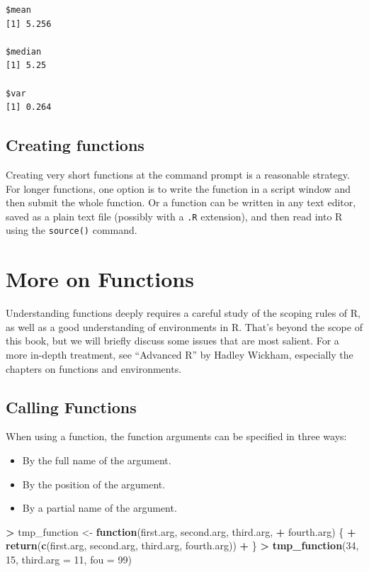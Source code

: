 \documentclass[]{krantz}
\makeatletter
\newenvironment{Shaded}{\begin{snugshade}}{\end{snugshade}}
\newcommand{\ControlFlowTok}[1]{\textcolor[rgb]{0.27,0.27,0.27}{\textbf{#1}}}
\newcommand{\DataTypeTok}[1]{\textcolor[rgb]{0.27,0.27,0.27}{#1}}
\newcommand{\DecValTok}[1]{\textcolor[rgb]{0.06,0.06,0.06}{#1}}
\newcommand{\KeywordTok}[1]{\textcolor[rgb]{0.27,0.27,0.27}{\textbf{#1}}}
\newcommand{\NormalTok}[1]{#1}
\newcommand{\OperatorTok}[1]{\textcolor[rgb]{0.43,0.43,0.43}{\textbf{#1}}}
\newcommand{\StringTok}[1]{\textcolor[rgb]{0.5,0.5,0.5}{#1}}
\providecommand{\tightlist}{%
  \setlength{\itemsep}{0pt}\setlength{\parskip}{0pt}}
\newenvironment{kframe}{%
\medskip{}
\setlength{\fboxsep}{.8em}
 \def\at@end@of@kframe{}%
 \ifinner\ifhmode%
  \def\at@end@of@kframe{\end{minipage}}%
  \begin{minipage}{\columnwidth}%
 \fi\fi%
 \def\FrameCommand##1{\hskip\@totalleftmargin \hskip-\fboxsep
 \colorbox{shadecolor}{##1}\hskip-\fboxsep
     \hskip-\linewidth \hskip-\@totalleftmargin \hskip\columnwidth}%
 \MakeFramed {\advance\hsize-\width
   \@totalleftmargin\z@ \linewidth\hsize
   \@setminipage}}%
 {\par\unskip\endMakeFramed%
 \at@end@of@kframe}
\renewenvironment{Shaded}{\begin{kframe}}{\end{kframe}}
\makeatother
\begin{document}
\begin{verbatim}
$mean
[1] 5.256

$median
[1] 5.25

$var
[1] 0.264
\end{verbatim}

\hypertarget{creating-functions}{%
\subsection{Creating functions}\label{creating-functions}}

Creating very short functions at the command prompt is a reasonable strategy. For longer functions, one option is to write the function in a script window and then submit the whole function. Or a function can be written in any text editor, saved as a plain text file (possibly with a \texttt{.R} extension), and then read into R using the \texttt{source()} command.

\hypertarget{more-on-functions}{%
\section{More on Functions}\label{more-on-functions}}

Understanding functions deeply requires a careful study of the scoping rules of R, as well as a good understanding of environments in R. That's beyond the scope of this book, but we will briefly discuss some issues that are most salient. For a more in-depth treatment, see ``Advanced R'' by Hadley Wickham, especially the chapters on functions and environments.

\hypertarget{calling-functions}{%
\subsection{Calling Functions}\label{calling-functions}}

When using a function, the function arguments can be specified in three ways:

\begin{itemize}
\tightlist
\item
  By the full name of the argument.
\item
  By the position of the argument.
\item
  By a partial name of the argument.
\end{itemize}

\begin{Shaded}
\begin{Highlighting}[]
\OperatorTok{>}\StringTok{ }\NormalTok{tmp_function <-}\StringTok{ }\ControlFlowTok{function}\NormalTok{(first.arg, second.arg, third.arg, }
\OperatorTok{+}\StringTok{   }\NormalTok{fourth.arg) \{}
\OperatorTok{+}\StringTok{   }\KeywordTok{return}\NormalTok{(}\KeywordTok{c}\NormalTok{(first.arg, second.arg, third.arg, fourth.arg))}
\OperatorTok{+}\StringTok{ }\NormalTok{\}}
\OperatorTok{>}\StringTok{ }\KeywordTok{tmp_function}\NormalTok{(}\DecValTok{34}\NormalTok{, }\DecValTok{15}\NormalTok{, }\DataTypeTok{third.arg =} \DecValTok{11}\NormalTok{, }\DataTypeTok{fou =} \DecValTok{99}\NormalTok{)}
\end{Highlighting}
\end{Shaded}
\end{document}
